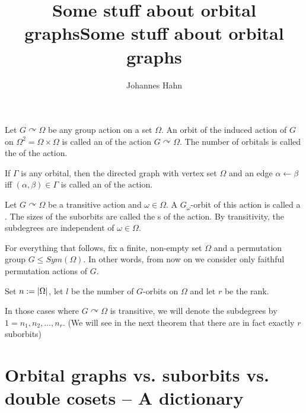 \documentclass[fontsize=11pt,fleqn,a4paper]{scrartcl}
\author{Johannes Hahn}
\title{Some stuff about orbital graphs}
\title{Some stuff about orbital graphs}
\begin{document}
\maketitle

\begin{definition}
Let $G\curvearrowright\Omega$ be any group action on a set $\Omega$. An orbit of the induced action of $G$ on $\Omega^2=\Omega\times\Omega$ is called an  of the action $G \curvearrowright \Omega$. The number of orbitals is called the  of the action.

If $\Gamma$ is any orbital, then the directed graph with vertex set $\Omega$ and an edge $\alpha\leftarrow\beta$ iff $(\alpha,\beta)\in\Gamma$ is called an  of the action.
\end{definition}

\begin{definition}
Let $G\curvearrowright\Omega$ be a transitive action and $\omega\in\Omega$. A $G_\omega$-orbit of this action is called a . The sizes of the suborbits are called the s of the action. By transitivity, the subdegrees are independent of $\omega\in\Omega$.
\end{definition}


\begin{convention}
For everything that follows, fix a finite, non-empty set $\Omega$ and a permutation group $G\leq Sym(\Omega)$. In other words, from now on we consider only faithful permutation actions of $G$.

Set $n:=\lvert\Omega\rvert$, let $l$ be the number of $G$-orbits on $\Omega$ and let $r$ be the rank.

In those cases where $G\curvearrowright\Omega$ is transitive, we will denote the subdegrees by $1=n_1,n_2,\ldots,n_r$. (We will see in the next theorem that there are in fact exactly $r$ suborbits)
\end{convention}


\section{Orbital graphs vs. suborbits vs. double cosets -- A dictionary}
\end{document}
